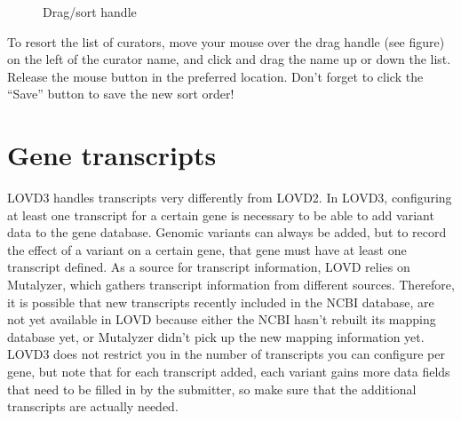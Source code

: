\documentclass[a4paper,oneside,openany,12pt]{memoir}
\begin{document}
\begin{figure} %
  \vspace{-26pt}
  \begin{framed}
     Drag/sort handle
  \end{framed}
\end{figure}
To resort the list of curators, move your mouse over the drag handle (see figure) on the left
 of the curator name, and click and drag the name up or down the list.
Release the mouse button in the preferred location.
Don't forget to click the ``Save'' button to save the new sort order!
\clearpage %










\hypertarget{c_transcripts}{}
\chapter{Gene transcripts}
LOVD3 handles transcripts very differently from LOVD2.
In LOVD3, configuring at least one transcript for a certain gene is necessary to be able to add variant data to the gene database.
Genomic variants can always be added, but to record the effect of a variant on a certain gene, that gene must have at least one transcript defined.
As a source for transcript information, LOVD relies on Mutalyzer, which gathers transcript information from different sources.
Therefore, it is possible that new transcripts recently included in the NCBI database, are not yet available in LOVD because
 either the NCBI hasn't rebuilt its mapping database yet, or Mutalyzer didn't pick up the new mapping information yet.
LOVD3 does not restrict you in the number of transcripts you can configure per gene, but note that for each transcript added,
 each variant gains more data fields that need to be filled in by the submitter, so make sure that the additional transcripts are actually needed.
\end{document}
